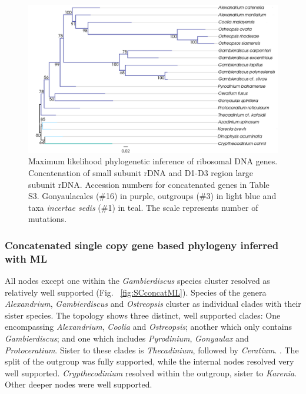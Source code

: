 \documentclass[12pt]{article}
\begin{document}
\begin{figure} 
\includegraphics[scale=.4]{figures/rDNA-ML.png} 
\caption{Maximum likelihood phylogenetic inference of ribosomal DNA genes. Concatenation of small subunit rDNA and D1-D3 region large subunit rDNA. Accession numbers for concatenated genes in Table S3. Gonyaulacales (\#16) in purple, outgroups (\#3) in light blue and taxa \textit{incertae sedis} (\#1) in teal. The scale represents number of mutations.} 
\label{fig:rdna}
\end{figure} 
\FloatBarrier

\subsubsection*{Concatenated single copy gene based phylogeny inferred with ML}
\FloatBarrier
All nodes except one within the \emph{Gambierdiscus} species cluster resolved as relatively well supported (Fig. ~\ref{fig:SCconcatML}). 
Species of the genera \emph{Alexandrium}, \emph{Gambierdiscus} and \emph{Ostreopsis} cluster as individual clades with their sister species.  
The topology shows three distinct, well supported clades: 
One encompassing \emph{Alexandrium}, \emph{Coolia} and \emph{Ostreopsis}; another which only contains \emph{Gambierdiscus}; and one which includes \emph{Pyrodinium}, \emph{Gonyaulax} and \emph{Protoceratium}. 
Sister to these clades is \emph{Thecadinium}, followed by \emph{Ceratium}. .
The split of the outgroup was fully supported, while the internal nodes resolved very well supported. 
\emph{Crypthecodinium} resolved within the outgroup, sister to \emph{Karenia}. 
Other deeper nodes were well supported.
 
\end{document}
